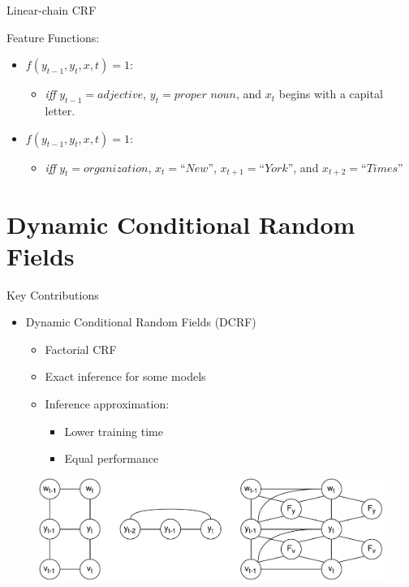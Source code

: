 \documentclass[presentation,bigger]{beamer}
\begin{document}
\begin{frame}[label={sec:orgheadline9}]{Linear-chain CRF}
\begin{block}{Feature Functions:}
\begin{itemize}
\item \(f(y_{t-1}, y_t, x, t) = 1\):
\begin{itemize}
\item \emph{iff} \(y_{t-1} = adjective\), \(y_t = \textit{proper noun}\), and \(x_t\) begins with a capital letter.
\end{itemize}
\item \(f(y_{t-1}, y_t, x, t) = 1\):
\begin{itemize}
\item \emph{iff} \(y_t = \textit{organization}\), \(x_{t} = \textit{``New''}\), \(x_{t+1} = \textit{``York''}\), and \(x_{t+2} = \textit{``Times''}\)
\end{itemize}
\end{itemize}
\end{block}
\end{frame}
\section{Dynamic Conditional Random Fields}
\label{sec:orgheadline20}
\begin{frame}[label={sec:orgheadline11}]{Key Contributions}
\begin{itemize}
\item Dynamic Conditional Random Fields (DCRF)
\begin{itemize}
\item Factorial CRF
\item Exact inference for some models
\item Inference approximation:
\begin{itemize}
\item Lower training time
\item Equal performance
\end{itemize}
\end{itemize}
\end{itemize}
\begin{figure}[htb]
\centering
\includegraphics[width=\textwidth]{figures/DCRF.pdf}
\end{figure}
\end{frame}
\end{document}
